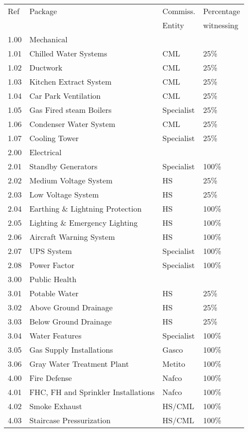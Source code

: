 
\label{chap:listofservices}

\begin{longtable}{llll}
\toprule
Ref	&Package	&Commiss.	&Percentage \\
     &         &Entity    &witnessing\\
\midrule
1.00	&Mechanical	&	&\\
1.01	&Chilled Water Systems	&CML	&25\%\\
1.02	&Ductwork  &CML		&25\%\\
1.03  &Kitchen Extract System &CML &25\%\\
1.04	&Car Park Ventilation 	&CML &25\%\\
1.05	&Gas Fired steam Boilers &Specialist&25\%\\	
1.06	&Condenser Water System 	&CML&25\%     \\
1.07    &Cooling Tower &Specialist&25\%  \\
\midrule
2.00	&Electrical		&&\\
2.01	&Standby Generators	&Specialist&100\%\\	
2.02	&Medium Voltage System	&HS&25\%\\	
2.03	&Low Voltage System		&HS&25\%\\
2.04	&Earthing \& Lightning Protection &HS&100\%\\		
2.05	&Lighting \& Emergency Lighting  &HS&100\%\\		
2.06	&Aircraft Warning System &HS&100\%\\		
2.07	&UPS System	&Specialist&100\%\\	
2.08 &Power Factor  &Specialist &100\%\\
\midrule
3.00	&Public Health		&&\\
3.01	&Potable Water	&HS&25\%\\	
3.02	&Above Ground Drainage &HS&25\%\\		
3.03	&Below Ground Drainage  &HS&25\%\\		
3.04	&Water Features	     &Specialist&100\%\\	
3.05	&Gas Supply Installations	&Gasco&100\%\\	
3.06 &Gray Water Treatment Plant&Metito&100\%\\
\midrule		
4.00	&Fire Defense &Nafco&100\% \\	
4.01	&FHC, FH and Sprinkler Installations	&Nafco&100\%\\	
4.02	&Smoke Exhaust		&HS/CML&100\% \\
4.03	&Staircase Pressurization          &HS/CML&100\%\\		

\end{longtable}
